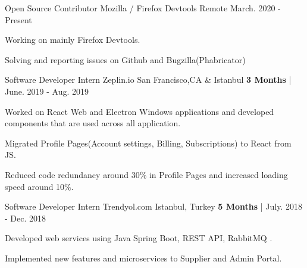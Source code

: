
\begin{cventries}

  \cventry
   {Open Source Contributor} %
    {Mozilla / Firefox Devtools} %
    {Remote} %
    { March. 2020 - Present} %
    {
      \begin{cvitems} %
        \item {Working on mainly Firefox Devtools.}
        \item {Solving and reporting issues on Github and Bugzilla(Phabricator)}
      \end{cvitems}
    }

\vspace{-2mm}
  \cventry
   {Software Developer Intern} %
    {Zeplin.io} %
    {San Francisco,CA \& Istanbul} %
    {\textbf{3 Months} | June. 2019 - Aug. 2019} %
    {
      \begin{cvitems} %
        \item {Worked on React Web and Electron Windows applications and developed components that are used across all application.}
		\item {Migrated Profile Pages(Account settings, Billing, Subscriptions) to React from JS.}
        \item {Reduced code redundancy around 30\% in Profile Pages and increased loading speed around 10\%. }
      \end{cvitems}
    }

\vspace{-2mm}
  \cventry
   {Software Developer Intern} %
    {Trendyol.com} %
    {Istanbul, Turkey} %
    {\textbf{5 Months} | July. 2018 - Dec. 2018} %
    {
      \begin{cvitems} %
		    \item {Developed web services using Java Spring Boot, REST API, RabbitMQ .}
        \item {Implemented new features and microservices to Supplier and Admin Portal.}
      \end{cvitems}
    }


\end{cventries}
